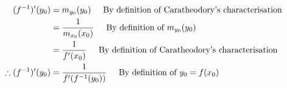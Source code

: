 \documentclass[a4paper]{article}
\begin{document}
\begin{enumerate}[label=\textbf{\arabic*.}]
\begin{enumerate}
		\begin{align*}
		(f^{-1})^\prime(y_0) & = m_{y_0}(y_0) \hspace{5mm} \text{By definition of Caratheodory's characterisation}\\
		& = \frac{1}{m_{x_0}(x_0)} \hspace{5mm} \text{By definition of } m_{y_0}(y_0)\\
		& = \frac{1}{f^\prime (x_0)} \hspace{5mm} \text{By definition of Caratheodory's characterisation}\\
		\therefore (f^{-1})^\prime(y_0) & = \frac{1}{f^\prime(f^{-1}(y_0))} \hspace{5mm} \text{By definition of } y_0 = f(x_0)\\
		\end{align*}






	\end{enumerate}









\end{enumerate}
\end{document}
